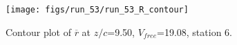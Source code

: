 \begin{figure}[H]
\centering
\texttt{[image: figs/run\_53/run\_53\_R\_contour]}
\caption{Contour plot of $\overline{r}$ at $z/c$=9.50, $V_{free}$=19.08, station 6.}
\label{fig:run_53_R_contour}
\end{figure}


